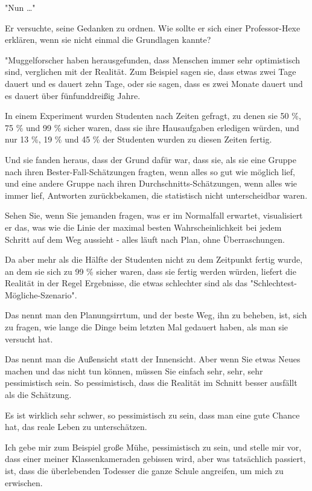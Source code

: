 {"Nun …"

Er versuchte, seine Gedanken zu ordnen. Wie sollte er sich einer Professor-Hexe erklären, wenn sie nicht einmal die Grundlagen kannte?

"Muggelforscher haben herausgefunden, dass Menschen immer sehr optimistisch sind, verglichen mit der Realität. Zum Beispiel sagen sie, dass etwas zwei Tage dauert und es dauert zehn Tage, oder sie sagen, dass es zwei Monate dauert und es dauert über fünfunddreißig Jahre.

In einem Experiment wurden Studenten nach Zeiten gefragt, zu denen sie 50 \%, 75 \% und 99 \% sicher waren, dass sie ihre Hausaufgaben erledigen würden, und nur 13 \%, 19 \% und 45 \% der Studenten wurden zu diesen Zeiten fertig.

Und sie fanden heraus, dass der Grund dafür war, dass sie, als sie eine Gruppe nach ihren Bester-Fall-Schätzungen fragten, wenn alles so gut wie möglich lief, und eine andere Gruppe nach ihren Durchschnitts-Schätzungen, wenn alles wie immer lief, Antworten zurückbekamen, die statistisch nicht unterscheidbar waren.

Sehen Sie, wenn Sie jemanden fragen, was er im Normalfall erwartet, visualisiert er das, was wie die Linie der maximal besten Wahrscheinlichkeit bei jedem Schritt auf dem Weg aussieht - alles läuft nach Plan, ohne Überraschungen.

Da aber mehr als die Hälfte der Studenten nicht zu dem Zeitpunkt fertig wurde, an dem sie sich zu 99 \% sicher waren, dass sie fertig werden würden, liefert die Realität in der Regel Ergebnisse, die etwas schlechter sind als das "Schlechtest-Mögliche-Szenario".

Das nennt man den Planungsirrtum, und der beste Weg, ihn zu beheben, ist, sich zu fragen, wie lange die Dinge beim letzten Mal gedauert haben, als man sie versucht hat.

Das nennt man die Außensicht statt der Innensicht. Aber wenn Sie etwas Neues machen und das nicht tun können, müssen Sie einfach sehr, sehr, sehr pessimistisch sein. So pessimistisch, dass die Realität im Schnitt besser ausfällt als die Schätzung.

Es ist wirklich sehr schwer, so pessimistisch zu sein, dass man eine gute Chance hat, das reale Leben zu unterschätzen.

Ich gebe mir zum Beispiel große Mühe, pessimistisch zu sein, und stelle mir vor, dass einer meiner Klassenkameraden gebissen wird, aber was tatsächlich passiert, ist, dass die überlebenden Todesser die ganze Schule angreifen, um mich zu erwischen.

}
